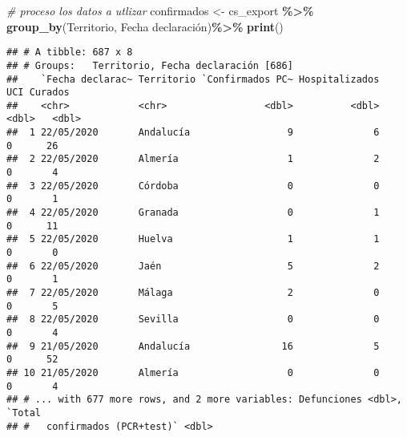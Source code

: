 \documentclass[
]{book}
\newenvironment{Shaded}{\begin{snugshade}}{\end{snugshade}}
\newcommand{\CommentTok}[1]{\textcolor[rgb]{0.56,0.35,0.01}{\textit{#1}}}
\newcommand{\DataTypeTok}[1]{\textcolor[rgb]{0.13,0.29,0.53}{#1}}
\newcommand{\KeywordTok}[1]{\textcolor[rgb]{0.13,0.29,0.53}{\textbf{#1}}}
\newcommand{\NormalTok}[1]{#1}
\newcommand{\OperatorTok}[1]{\textcolor[rgb]{0.81,0.36,0.00}{\textbf{#1}}}
\newcommand{\StringTok}[1]{\textcolor[rgb]{0.31,0.60,0.02}{#1}}
\begin{document}
\begin{Shaded}
\begin{Highlighting}[]
\CommentTok{\# proceso los datos a utlizar}
\NormalTok{confirmados \textless{}{-}}\StringTok{ }
\StringTok{  }\NormalTok{cs\_export }\OperatorTok{\%\textgreater{}\%}\StringTok{ }
\StringTok{  }\KeywordTok{group\_by}\NormalTok{(Territorio, }\StringTok{\textasciigrave{}}\DataTypeTok{Fecha declaración}\StringTok{\textasciigrave{}}\NormalTok{)}\OperatorTok{\%\textgreater{}\%}\StringTok{ }
\StringTok{  }\KeywordTok{print}\NormalTok{()}
\end{Highlighting}
\end{Shaded}

\begin{verbatim}
## # A tibble: 687 x 8
## # Groups:   Territorio, Fecha declaración [686]
##    `Fecha declarac~ Territorio `Confirmados PC~ Hospitalizados   UCI Curados
##    <chr>            <chr>                 <dbl>          <dbl> <dbl>   <dbl>
##  1 22/05/2020       Andalucía                 9              6     0      26
##  2 22/05/2020       Almería                   1              2     0       4
##  3 22/05/2020       Córdoba                   0              0     0       1
##  4 22/05/2020       Granada                   0              1     0      11
##  5 22/05/2020       Huelva                    1              1     0       0
##  6 22/05/2020       Jaén                      5              2     0       1
##  7 22/05/2020       Málaga                    2              0     0       5
##  8 22/05/2020       Sevilla                   0              0     0       4
##  9 21/05/2020       Andalucía                16              5     0      52
## 10 21/05/2020       Almería                   0              0     0       4
## # ... with 677 more rows, and 2 more variables: Defunciones <dbl>, `Total
## #   confirmados (PCR+test)` <dbl>
\end{verbatim}
\end{document}
